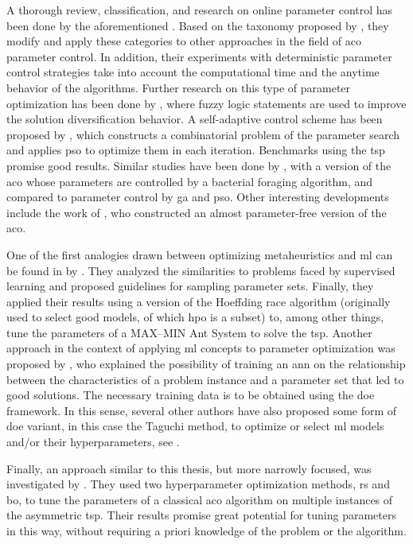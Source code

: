 A thorough review, classification, and research on online parameter control has been done by the aforementioned \citet{stutzle2012parameter}. Based on the taxonomy proposed by \citeauthor{eiben1999parameter}, they modify and apply these categories to other approaches in the field of \gls{aco} parameter control. In addition, their experiments with deterministic parameter control strategies take into account the computational time and the anytime behavior of the algorithms. Further research on this type of parameter optimization has been done by \citet{neyoy2013dynamic}, where fuzzy logic statements are used to improve the solution diversification behavior. 
 A self-adaptive control scheme has been proposed by \citet{hao2006adaptive}, which constructs a combinatorial problem of the parameter search and applies \gls{pso} to optimize them in each iteration. Benchmarks using the \gls{tsp} promise good results. Similar studies have been done by \citet{li2016parameter}, with a version of the \gls{aco} whose parameters are controlled by a bacterial foraging algorithm, and compared to parameter control by \gls{ga} and \gls{pso}.
 Other interesting developments include the work of \citet{randall2004near}, who constructed an almost parameter-free version of the \gls{aco}.
 
One of the first analogies drawn between optimizing metaheuristics and \gls{ml} can be found in  by \citet{birattari2009tuning}. They analyzed the similarities to problems faced by supervised learning and proposed guidelines for sampling parameter sets. Finally, they applied their results using a version of the Hoeffding race algorithm \cite{maron1993hoeffding} (originally used to select good models, of which \gls{hpo} is a subset) to, among other things, tune the parameters of a MAX–MIN Ant System to solve the \gls{tsp}.
Another approach in the context of applying \gls{ml} concepts to parameter optimization was proposed by \citet{dobslaw2010parameter}, who explained the possibility of training an \gls{ann} on the relationship between the characteristics of a problem instance and a parameter set that led to good solutions. The necessary training data is to be obtained using the \gls{doe} framework. In this sense, several other authors have also proposed some form of \gls{doe} variant, in this case the Taguchi method, to optimize or select \gls{ml} models and/or their hyperparameters, see \cite{packianather2000optimizing, tortum2007investigation, jung2011artificial}.

Finally, an approach similar to this thesis, but more narrowly focused, was investigated by \citet{yin2021bayesian}. They used two hyperparameter optimization methods, \gls{rs} and \gls{bo}, to tune the parameters of a classical \gls{aco} algorithm on multiple instances of the asymmetric \gls{tsp}. Their results promise great potential for tuning parameters in this way, without requiring a priori knowledge of the problem or the algorithm.